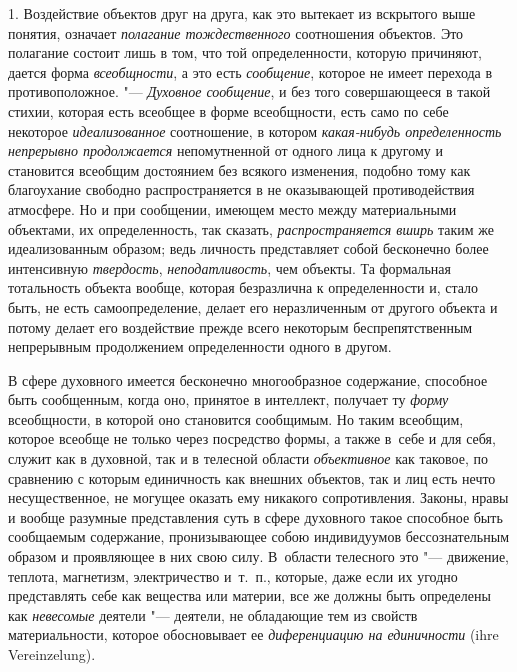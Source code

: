 1. Воздействие объектов друг на друга, как это вытекает из
вскрытого выше понятия, означает
{\em полагание тождественного}
соотношения объектов. Это полагание состоит лишь в том, что
той определенности, которую
причиняют,
дается форма
{\em всеобщности}, а это
есть {\em сообщение},
которое не имеет перехода в противоположное. "---
{\em Духовное сообщение},
и без того совершающееся в такой стихии, которая есть
всеобщее в форме всеобщности, есть само по себе некоторое
{\em идеализованное}
соотношение, в котором
{\em какая-нибудь определенность
непрерывно продолжается} непомутненной от одного лица к
другому и становится всеобщим достоянием без всякого изменения, подобно
тому как благоухание свободно распространяется в не оказывающей
противодействия атмосфере. Но и при сообщении, имеющем место между
материальными объектами, их определенность, так сказать,
{\em распространяется вширь}
таким же идеализованным образом; ведь личность представляет
собой бесконечно более интенсивную
{\em твердость},{\em
неподатливость}, чем объекты. Та формальная
тотальность объекта вообще, которая безразлична к определенности и, стало
быть, не есть самоопределение, делает его неразличенным от другого объекта
и потому делает его воздействие прежде всего некоторым беспрепятственным
непрерывным продолжением определенности одного в другом.

В сфере духовного имеется бесконечно многообразное содержание,
способное быть сообщенным, когда оно, принятое в интеллект, получает ту
{\em форму} всеобщности,
в которой оно становится сообщимым. Но таким всеобщим, которое всеобще не
только через посредство формы, а также в~себе и для себя, служит как в
духовной, так и в телесной области
{\em объективное} как
таковое, по сравнению с которым единичность как внешних объектов, так и лиц
есть нечто несущественное, не могущее оказать ему никакого сопротивления.
Законы, нравы и вообще разумные представления суть в сфере духовного такое
способное быть сообщаемым содержание, пронизывающее собою индивидуумов
бессознательным образом и проявляющее в них свою силу. В~области телесного
это "--- движение, теплота, магнетизм, электричество и~т.~п.,
которые, даже если их угодно представлять себе как вещества или материи,
все же должны быть определены как
{\em невесомые} деятели
"--- деятели, не обладающие тем из свойств материальности,
которое обосновывает ее
{\em диференциацию на единичности} (ihre Verein\-zelung).


